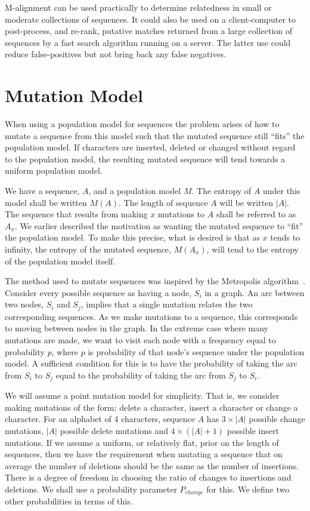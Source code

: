 \documentclass[letterpaper,11pt,oneside]{article}
\begin{document}
M-alignment can be used practically to determine relatedness
in small or moderate collections of sequences.
It could also be used on a client-computer to post-process, and re-rank,
putative matches returned from a large collection of sequences
by a fast search algorithm running on a server.
The latter use could reduce false-positives but not bring back
any false negatives.




%



\appendix
\section{Mutation Model}
\label{sec:mutations}

When using a population model for sequences the problem arises of how to
mutate a sequence from this model such that the mutated sequence still
``fits'' the population model.  If characters are inserted, deleted or changed
without regard to the population model, the resulting mutated sequence will
tend towards a uniform population model.

We have a sequence, $A$, and a population model $M$.  The entropy of $A$ under
this model shall be written $M(A)$.  The length of sequence $A$ will be
written $|A|$.  The sequence that results from making $x$ mutations to $A$
shall be referred to as $A_x$.  We earlier described the motivation as wanting
the mutated sequence to ``fit'' the population model.  To make this precise,
what is desired is that as $x$ tends to infinity, the entropy of the mutated
sequence, $M(A_x)$, will tend to the entropy of the population model itself.

The method used to mutate sequences was inspired by the Metropolis
algorithm~\cite{metropolis53}.  Consider every possible sequence as having a
node, $S_i$ in a graph.  An arc between two nodes, $S_i$ and $S_j$, implies
that a single mutation relates the two corresponding sequences.  As we make
mutations to a sequence, this corresponds to moving between nodes in the
graph.  In the extreme case where many mutations are made, we want to visit
each node with a frequency equal to probability $p$, where $p$ is probability
of that node's sequence under the population model.  A sufficient condition
for this is to have the probability of taking the arc from $S_i$ to $S_j$
equal to the probability of taking the arc from $S_j$ to $S_i$.

We will assume a point mutation model for simplicity.  That is, we consider
making mutations of the form: delete a character, insert a character or change
a character.  For an alphabet of 4 characters, sequence $A$ has $3\times|A|$
possible change mutations, $|A|$ possible delete mutations and
$4\times(|A|+1)$ possible insert mutations.  If we assume a uniform, or
relatively flat, prior on the length of sequences, then we have the
requirement when mutating a sequence that on average the number of deletions
should be the same as the number of insertions.  There is a degree of freedom
in choosing the ratio of changes to insertions and deletions.  We shall use a
probability parameter $P_{change}$ for this.  We define two other probabilities
in terms of this.
\end{document}
